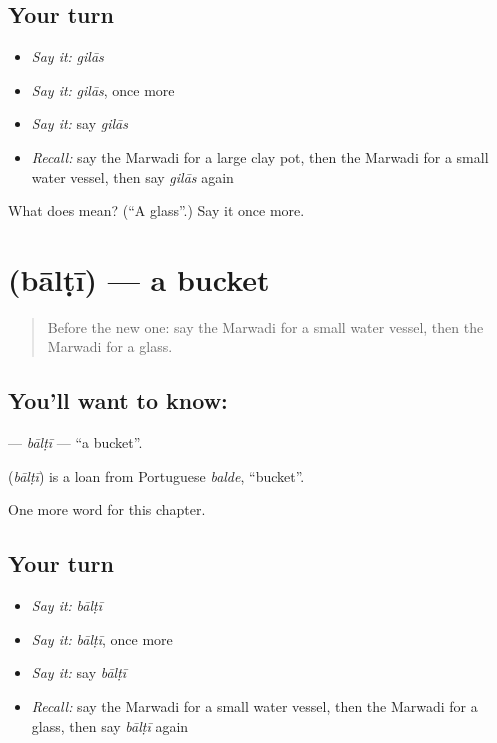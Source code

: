 \subsection*{Your turn}
\begin{itemize}
\raggedright
  \item \emph{Say it:} \emph{gilās}
  \item \emph{Say it:} \emph{gilās}, once more
  \item \emph{Say it:} say \emph{gilās}
  \item \emph{Recall:} say the Marwadi for a large clay pot, then the Marwadi for a small water vessel, then say \emph{gilās} again
\end{itemize}

\begin{tcolorbox}[breakable,colback=teal!4,colframe=teal!35!black,title={Before you move on}]
What does  mean? (\textquotedblleft{}A glass\textquotedblright{}.) Say it once more.
\end{tcolorbox}
\section[\texorpdfstring{\mw{बाल्टी} (bālṭī)}{बाल्टी (bālṭī)}]{ (bālṭī) — a bucket}

\label{lesson:MW-C119-balti}



\begin{quote}
Before the new one: say the Marwadi for a small water vessel, then the Marwadi for a glass.
\end{quote}

\subsection*{You'll want to know: }
\textbf{} — \emph{bālṭī} — \textquotedblleft{}a bucket\textquotedblright{}.

\begin{cousinweb}
\textbf{} (\emph{bālṭī}) is a loan from Portuguese \emph{balde}, \textquotedblleft{}bucket\textquotedblright{}.
\end{cousinweb}

\begin{grammarlens}[title={What you've built}]
One more word for this chapter.
\end{grammarlens}

\subsection*{Your turn}
\begin{itemize}
\raggedright
  \item \emph{Say it:} \emph{bālṭī}
  \item \emph{Say it:} \emph{bālṭī}, once more
  \item \emph{Say it:} say \emph{bālṭī}
  \item \emph{Recall:} say the Marwadi for a small water vessel, then the Marwadi for a glass, then say \emph{bālṭī} again
\end{itemize}

